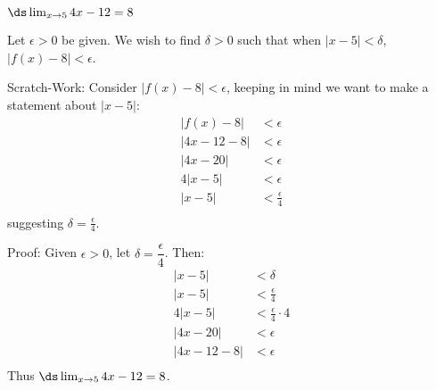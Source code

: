 {$\ds\lim_{x\to 5} 4x-12=8$}
{Let $\epsilon >0$ be given. We wish to find $\delta >0$ such that when $|x-5|<\delta$, $|f(x)-8|<\epsilon$. 

Scratch-Work:
Consider $|f(x)-8|<\epsilon$, keeping in  mind we want to make a statement about $|x-5|$:
\begin{align*}
|f(x)-8|&<\epsilon \\
|4x-12-8|&<\epsilon \\
|4x-20|&<\epsilon\\
4|x-5|&<\epsilon \\
|x-5|&<\frac{\epsilon}{4}\\
\end{align*}
suggesting $\delta =\frac{\epsilon}4$.

Proof: Given $\epsilon>0$, let $\delta =\dfrac{\epsilon}4$. Then:
\begin{align*}
|x - 5| &< \delta \\
|x - 5| &< \frac{\epsilon}{4} \\
4|x - 5| &< \frac{\epsilon}{4}\cdot 4\\
|4x-20|&< \epsilon \\
|4x-12-8|&< \epsilon  \\
\end{align*}
Thus  $\ds \lim_{x\to 5}4x-12=8$.}



